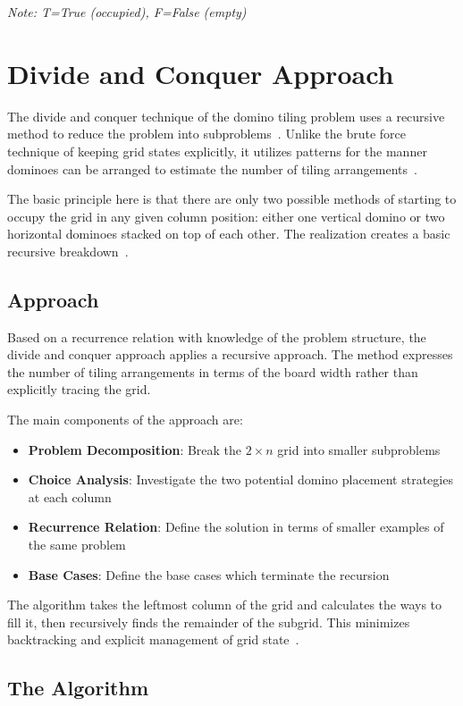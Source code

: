 \documentclass[conference]{IEEEtran}
\begin{document}
\textit{Note: T=True (occupied), F=False (empty)}


\section{Divide and Conquer Approach}

The divide and conquer technique of the domino tiling problem uses a recursive method to reduce the problem into subproblems~\cite{b1, b2}. Unlike the brute force technique of keeping grid states explicitly, it utilizes patterns for the manner dominoes can be arranged to estimate the number of tiling arrangements~\cite{b2}.

The basic principle here is that there are only two possible methods of starting to occupy the grid in any given column position: either one vertical domino or two horizontal dominoes stacked on top of each other. The realization creates a basic recursive breakdown~\cite{b1, b5}.

\subsection{Approach}

Based on a recurrence relation with knowledge of the problem structure, the divide and conquer approach applies a recursive approach. The method expresses the number of tiling arrangements in terms of the board width rather than explicitly tracing the grid.

The main components of the approach are:

\begin{itemize}
    \item \textbf{Problem Decomposition}: Break the $2 \times n$ grid into smaller subproblems
\item \textbf{Choice Analysis}: Investigate the two potential domino placement strategies at each column
\item \textbf{Recurrence Relation}: Define the solution in terms of smaller examples of the same problem
\item \textbf{Base Cases}: Define the base cases which terminate the recursion
\end{itemize}

The algorithm takes the leftmost column of the grid and calculates the ways to fill it, then recursively finds the remainder of the subgrid. This minimizes backtracking and explicit management of grid state~\cite{b2, b3}.

\subsection{The Algorithm}
\end{document}
